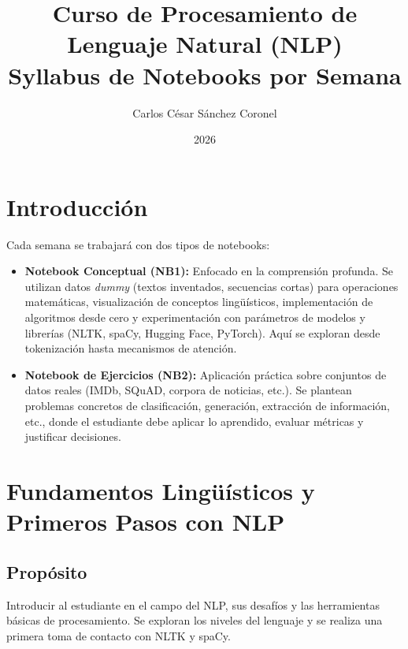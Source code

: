 \documentclass[12pt,a4paper]{article}
\title{\textbf{Curso de Procesamiento de Lenguaje Natural (NLP)}\\ \large Syllabus de Notebooks por Semana}
\author{Carlos César Sánchez Coronel}
\date{2026}
\begin{document}
\maketitle

\section*{Introducción}
Cada semana se trabajará con dos tipos de notebooks:
\begin{itemize}[leftmargin=*]
    \item \textbf{Notebook Conceptual (NB1):} Enfocado en la comprensión profunda. Se utilizan datos \textit{dummy} (textos inventados, secuencias cortas) para operaciones matemáticas, visualización de conceptos lingüísticos, implementación de algoritmos desde cero y experimentación con parámetros de modelos y librerías (NLTK, spaCy, Hugging Face, PyTorch). Aquí se exploran desde tokenización hasta mecanismos de atención.
    \item \textbf{Notebook de Ejercicios (NB2):} Aplicación práctica sobre conjuntos de datos reales (IMDb, SQuAD, corpora de noticias, etc.). Se plantean problemas concretos de clasificación, generación, extracción de información, etc., donde el estudiante debe aplicar lo aprendido, evaluar métricas y justificar decisiones.
\end{itemize}

\newpage

\section{Fundamentos Lingüísticos y Primeros Pasos con NLP}
\subsection*{Propósito}
Introducir al estudiante en el campo del NLP, sus desafíos y las herramientas básicas de procesamiento. Se exploran los niveles del lenguaje y se realiza una primera toma de contacto con NLTK y spaCy.
\end{document}
